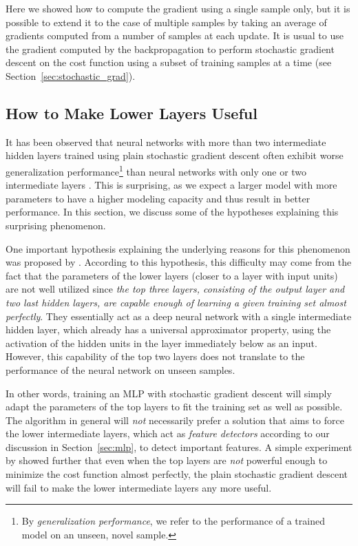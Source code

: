 \documentclass{now}
\begin{document}
Here we showed how to compute the gradient using a single sample
only, but it is possible to extend it to the case of multiple
samples by taking an average of gradients computed from a number
of samples at each update. It is usual to use the gradient
computed by the backpropagation to perform stochastic gradient
descent on the cost function using a subset of training samples
at a time (see Section~\ref{sec:stochastic_grad}). 

\subsection{How to Make Lower Layers Useful}
\label{sec:bp_imp}

It has been observed that neural networks with more than two
intermediate hidden layers trained using plain stochastic
gradient descent often exhibit worse generalization performance\footnote{By
\textit{generalization performance}, we refer to the
performance of a trained model on an unseen, novel sample.
}
than neural networks with only one or two intermediate layers
\citep[see, e.g.][]{Bengio2007a}. This is surprising, as we
expect a larger model with more parameters to have a higher
modeling capacity and thus result in better performance. In this
section, we discuss some of the hypotheses explaining this
surprising phenomenon.

One important hypothesis explaining the underlying reasons
for this phenomenon was proposed by \citet{Bengio2007nips}.
According to this hypothesis, this difficulty may come from
the fact that the parameters of the lower layers (closer to
a layer with input units) are 
not well utilized
since
\textit{the top three layers, consisting of the output layer
and two last hidden layers, are capable enough of learning a
given training set almost perfectly}.  They essentially act
as a deep neural network with a single intermediate hidden
layer, which already has a universal approximator property,
using the activation of the hidden units in the layer
immediately below as an input. However, this capability of
the top two layers does not translate to the performance of
the neural network on unseen samples.

In other words, training an MLP with stochastic gradient descent
will simply adapt the parameters of the top layers to fit the
training set as well as possible. The algorithm in general will
\textit{not} necessarily prefer a solution that aims to force the
lower intermediate layers, which act as \textit{feature
detectors} according to our discussion in
Section~\ref{sec:mlp}, to detect important features.  A
simple experiment by \citet{Bengio2007nips} showed further
that even when the top layers are \textit{not} powerful
enough to minimize the cost function almost perfectly, the
plain stochastic gradient descent will fail to make the lower
intermediate layers any more useful.
\end{document}
